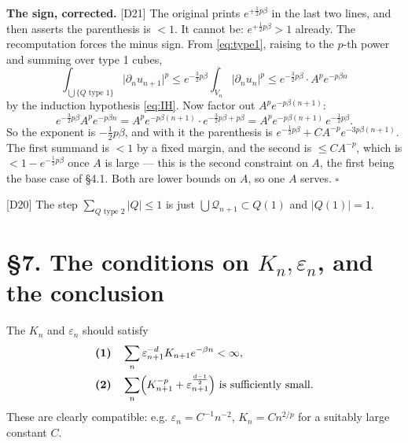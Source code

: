 \documentclass[11pt,reqno]{amsart}
\theoremstyle{plain}
\theoremstyle{definition}
\theoremstyle{plain}
\theoremstyle{definition}
\theoremstyle{remark}
\newcommand{\nd}{\partial_n}
\newcommand{\Ledger}[1]{{\scriptsize\textsf{[#1]}}}
\begin{document}
\begin{expansion}
\textbf{The sign, corrected.} \Ledger{D21} The original prints
$e^{+\frac12p\beta}$ in the last two lines, and then asserts the parenthesis is
$<1$. It cannot be: $e^{+\frac12p\beta}>1$ already. The recomputation forces the
minus sign. From \eqref{eq:type1}, raising to the $p$-th power and summing over
type 1 cubes,
\[\int_{\bigcup\{Q\text{ type }1\}}\bigl|\nd u_{n+1}\bigr|^p
 \le e^{-\frac32p\beta}\int_{V_n}\bigl|\nd u_n\bigr|^p
 \le e^{-\frac32p\beta}\cdot A^pe^{-p\beta n}\]
by the induction hypothesis \eqref{eq:IH}. Now factor out $A^pe^{-p\beta(n+1)}$:
\[e^{-\frac32p\beta}A^pe^{-p\beta n}
 =A^pe^{-p\beta(n+1)}\cdot e^{-\frac32p\beta+p\beta}
 =A^pe^{-p\beta(n+1)}\,e^{-\frac12p\beta}.\]
So the exponent is $-\frac12p\beta$, and with it the parenthesis is
$e^{-\frac12p\beta}+CA^{-p}e^{-3p\beta(n+1)}$. The first summand is $<1$ by a fixed
margin, and the second is $\le CA^{-p}$, which is $<1-e^{-\frac12p\beta}$ once
$A$ is large --- this is the second constraint on $A$, the first being the base case
of \S4.1. Both are lower bounds on $A$, so one $A$ serves. \hfill$\square$

\Ledger{D20} The step $\sum_{Q\text{ type }2}|Q|\le1$ is just
$\bigcup\mathcal Q_{n+1}\subset Q(1)$ and $|Q(1)|=1$.
\end{expansion}

\section*{\S7. The conditions on $K_n,\varepsilon_n$, and the conclusion}

The $K_n$ and $\varepsilon_n$ should satisfy
\begin{align}
 &\textbf{(1)}\quad \sum_n\varepsilon_{n+1}^{-d}K_{n+1}e^{-\beta n}<\infty,
 \label{eq:cond1}\\
 &\textbf{(2)}\quad \sum_n\Bigl(K_{n+1}^{-p}+\varepsilon_{n+1}^{\frac{d-1}2}\Bigr)
   \ \text{is sufficiently small.}\label{eq:cond2}
\end{align}
These are clearly compatible: e.g. $\varepsilon_n=C^{-1}n^{-2}$, $K_n=Cn^{2/p}$ for
a suitably large constant $C$.
\end{document}
